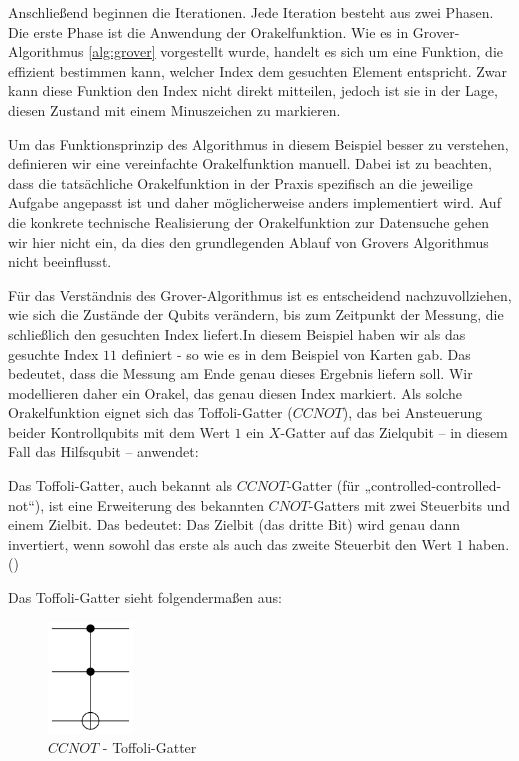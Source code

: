 Anschließend beginnen die Iterationen. Jede Iteration besteht aus zwei Phasen. Die erste Phase ist die Anwendung der Orakelfunktion. Wie es in Grover-Algorithmus \ref{alg:grover} vorgestellt wurde, handelt es sich um eine Funktion, die effizient bestimmen kann, welcher Index dem gesuchten Element entspricht. Zwar kann diese Funktion den Index nicht direkt mitteilen, jedoch ist sie in der Lage, diesen Zustand mit einem Minuszeichen zu markieren.

Um das Funktionsprinzip des Algorithmus in diesem Beispiel besser zu verstehen, definieren wir eine vereinfachte Orakelfunktion manuell. Dabei ist zu beachten, dass die tatsächliche Orakelfunktion in der Praxis spezifisch an die jeweilige Aufgabe angepasst ist und daher möglicherweise anders implementiert wird. Auf die konkrete technische Realisierung der Orakelfunktion zur Datensuche gehen wir hier nicht ein, da dies den grundlegenden Ablauf von Grovers Algorithmus nicht beeinflusst.

Für das Verständnis des Grover-Algorithmus ist es entscheidend nachzuvollziehen, wie sich die Zustände der Qubits verändern, bis zum Zeitpunkt der Messung, die schließlich den gesuchten Index liefert.In diesem Beispiel haben wir als das gesuchte Index $11$ definiert - so wie es in dem Beispiel von Karten gab. Das bedeutet, dass die Messung am Ende genau dieses Ergebnis liefern soll. Wir modellieren daher ein Orakel, das genau diesen Index markiert. Als solche Orakelfunktion eignet sich das Toffoli-Gatter ($CCNOT$), das bei Ansteuerung beider Kontrollqubits mit dem Wert $1$ ein $X$-Gatter auf das Zielqubit – in diesem Fall das Hilfsqubit – anwendet:

\begin{definition}
\label{def:toffoli}
Das Toffoli-Gatter, auch bekannt als $CCNOT$-Gatter (für „controlled-controlled-not“), ist eine Erweiterung des bekannten $CNOT$-Gatters mit zwei Steuerbits und einem Zielbit. Das bedeutet: Das Zielbit (das dritte Bit) wird genau dann invertiert, wenn sowohl das erste als auch das zweite Steuerbit den Wert $1$ haben.(\cite{toffoli_proceedings_1980})
\end{definition}

Das Toffoli-Gatter sieht folgendermaßen aus:
\begin{figure}[H]
    \centering
    \includegraphics[width=0.2\textwidth]{images/basic-algorithms/toffoli.png}
    \caption{$CCNOT$ - Toffoli-Gatter}
    \label{fig:toffoli-gate}
\end{figure}

